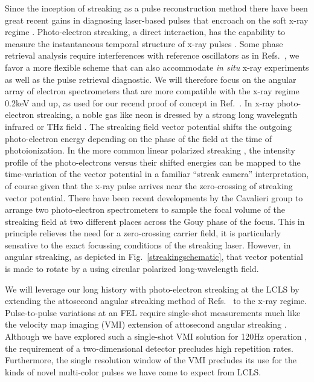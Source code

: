 Since the inception of streaking as a pulse reconstruction method \cite{Zenghu2005,KellerAngularStreaking} there have been great recent gains in diagnosing laser-based pulses that encroach on the soft x-ray regime \cite{Biegert2016,WornerSci2017,Worner2017}.
Photo-electron streaking, a direct interaction, has the capability to measure the instantaneous temporal structure of x-ray pulses \cite{Hentschel2001}.
Some phase retrieval analysis require interferences with reference oscillators as in Refs.~\cite{Zenghu2010,Cocke2013}, we favor a more flexible scheme that can also accommodate \textit{in situ} x-ray experiments as well as the pulse retrieval diagnostic.
We will therefore focus on the angular array of electron spectrometers that are more compatible with the x-ray regime 0.2keV and up, as used for our recend proof of concept in Ref.~\cite{Nick2018}.
In x-ray photo-electron streaking, a noble gas like neon is dressed by a strong long wavelegnth infrared or THz field \cite{Helml2014,Juranic2014,Schulz2015}.
The streaking field vector potential shifts the outgoing photo-electron energy depending on the phase of the field at the time of photoionization.
In the more common linear polarized streaking \cite{Helml2014,Juranic2014,Schulz2015,Matthias2016}, the intensity profile of the photo-electrons versus their shifted energies can be mapped to the time-variation of the vector potential in a familiar ``streak camera'' interpretation, of course given that the x-ray pulse arrives near the zero-crossing of streaking vector potential.
There have been recent developments by the Cavalieri group to arrange two photo-electron spectrometers to sample the focal volume of the streaking field at two different places across the Gouy phase of the focus.
This in principle relieves the need for a zero-crossing carrier field, it is particularly sensative to the exact focussing conditions of the streaking laser.
However, in angular streaking, as depicted in Fig.~\ref{streakingschematic}, that vector potential is made to rotate by a using circular polarized long-wavelength field.

We will leverage our long history with photo-electron streaking at the LCLS \cite{Duesterer11,Meyer12,Helml2014} by extending the attosecond angular streaking method of Refs.~\cite{CorkumAngularStreaking,KellerAngularStreaking} to the x-ray regime.
Pulse-to-pulse variations at an FEL require single-shot measurements much like the velocity map imaging (VMI) \cite{VrakkingRSI} extension of attosecond angular streaking \cite{attoclockVMI2013}.
Although we have explored such a single-shot VMI solution for 120Hz operation \cite{Siqi2018}, the requirement of a two-dimensional detector precludes high repetition rates. 
Furthermore, the single resolution window of the VMI precludes its use for the kinds of novel multi-color pulses we have come to expect from LCLS.

